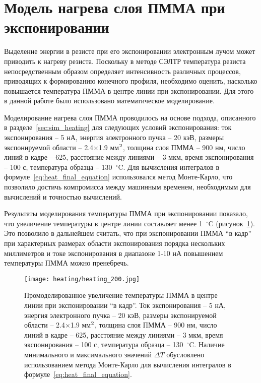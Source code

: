 \section{Модель нагрева слоя ПММА при экспонировании}

Выделение энергии в резисте при его экспонировании электронным лучом может приводить к нагреву резиста. Поскольку в методе СЭЛТР температура резиста непосредственным образом определяет интенсивность различных процессов, приводящих к формированию конечного профиля, необходимо оценить, насколько повышается температура ПММА в центре линии при экспонировании. Для этого в данной работе было использовано математическое моделирование.

Моделирование нагрева слоя ПММА проводилось на основе подхода, описанного в разделе~\ref{sec:sim_heating} для следующих условий экспонирования: ток экспонирования -- 5 нА, энергия электронного пучка -- 20 кэВ, размеры экспонируемой области -- 2.4$\times$1.9 мм$^\text{2}$, толщина слоя ПММА -- 900 нм, число линий в кадре -- 625, расстояние между линиями -- 3 мкм, время экспонирования -- 100 с, температура образца -- 130~$^\circ$C. Для вычисления интегралов в формуле~\ref{eq:heat_final_equation} использовался метод Монте-Карло, что позволило достичь компромисса между машинным временем, необходимым для вычислений и точностью вычислений.

Результаты моделирования температуры ПММА при экспонировании показало, что увеличение температуры в центре линии составляет менее 1~$^\circ$C (рисунок~\ref{fig:heating}). Это позволило в дальнейшем считать, что при экспонировании ПММА ``в кадр'' при характерных размерах области экспонирования порядка нескольких миллиметров и токе экспонирования в диапазоне 1-10 нА повышением температуры ПММА можно пренебречь.

\begin{figure}[h!]
	\begin{center}
		\texttt{[image: heating/heating\_200.jpg]}
	\end{center}
	\vspace{-1em}
	\caption{Промоделированное увеличение температуры ПММА в центре линии при экспонировании ``в кадр''. Ток экспонирования -- 5 нА, энергия электронного пучка -- 20 кэВ, размеры экспонируемой области -- 2.4$\times$1.9 мм$^\text{2}$, толщина слоя ПММА -- 900 нм, число линий в кадре -- 625, расстояние между линиями -- 3 мкм, время экспонирования -- 100 с, температура образца -- 130~$^\circ$C. Наличие минимального и максимального значений $\Delta T$ обусловлено использованием метода Монте-Карло для вычисления интегралов в формуле~\ref{eq:heat_final_equation}.}
	\label{fig:heating}
\end{figure}




